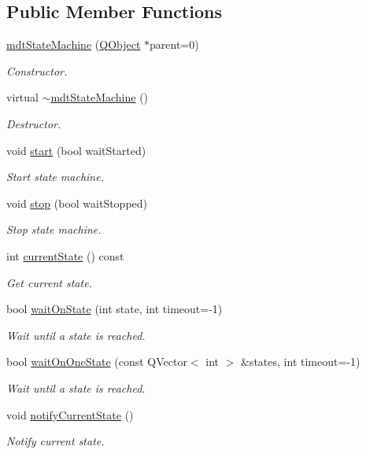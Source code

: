 \subsection*{Public Member Functions}
\begin{DoxyCompactItemize}
\item 
\hyperlink{classmdt_state_machine_af2b15b9b0bbf48c6adb75a69dd255718}{mdt\-State\-Machine} (\hyperlink{class_q_object}{Q\-Object} $\ast$parent=0)
\begin{DoxyCompactList}\small\item\em Constructor. \end{DoxyCompactList}\item 
virtual \hyperlink{classmdt_state_machine_ac32776aa0587ec290576e6e2cafb631f}{$\sim$mdt\-State\-Machine} ()
\begin{DoxyCompactList}\small\item\em Destructor. \end{DoxyCompactList}\item 
void \hyperlink{classmdt_state_machine_a1dcc7d12c50500cdbda8b7ef1e141901}{start} (bool wait\-Started)
\begin{DoxyCompactList}\small\item\em Start state machine. \end{DoxyCompactList}\item 
void \hyperlink{classmdt_state_machine_a1a4d6288c13cc1ed334de850836132a8}{stop} (bool wait\-Stopped)
\begin{DoxyCompactList}\small\item\em Stop state machine. \end{DoxyCompactList}\item 
int \hyperlink{classmdt_state_machine_a16a99b2d6d077e1ea39622ef0e2b5a5b}{current\-State} () const 
\begin{DoxyCompactList}\small\item\em Get current state. \end{DoxyCompactList}\item 
bool \hyperlink{classmdt_state_machine_ab14dc03757e493d35d510af8a1b436b6}{wait\-On\-State} (int state, int timeout=-\/1)
\begin{DoxyCompactList}\small\item\em Wait until a state is reached. \end{DoxyCompactList}\item 
bool \hyperlink{classmdt_state_machine_a12e8c253a5ca6e92e9f1c92f1546e4b8}{wait\-On\-One\-State} (const Q\-Vector$<$ int $>$ \&states, int timeout=-\/1)
\begin{DoxyCompactList}\small\item\em Wait until a state is reached. \end{DoxyCompactList}\item 
void \hyperlink{classmdt_state_machine_a6fa653fc7e2ea8a58e2d160ba6d96013}{notify\-Current\-State} ()
\begin{DoxyCompactList}\small\item\em Notify current state. \end{DoxyCompactList}\end{DoxyCompactItemize}


